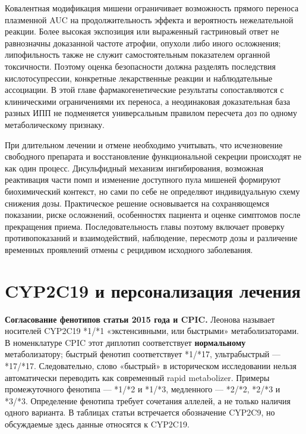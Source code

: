 \documentclass[11pt,a4paper,notitlepage]{report}
\newcommand{\src}[1]{\unskip\space\cite{#1}}
\begin{document}
Ковалентная модификация мишени ограничивает возможность прямого переноса плазменной AUC на продолжительность эффекта и вероятность нежелательной реакции. Более высокая экспозиция или выраженный гастриновый ответ не равнозначны доказанной частоте атрофии, опухоли либо иного осложнения; липофильность также не служит самостоятельным показателем органной токсичности. Поэтому оценка безопасности должна разделять последствия кислотосупрессии, конкретные лекарственные реакции и наблюдательные ассоциации. В этой главе фармакогенетические результаты сопоставляются с клиническими ограничениями их переноса, а неодинаковая доказательная база разных ИПП не подменяется универсальным правилом пересчета доз по одному метаболическому признаку.\src{molcys,molrestore,leonova2015,cpic,uslabel,kidney}

При длительном лечении и отмене необходимо учитывать, что исчезновение свободного препарата и восстановление функциональной секреции происходят не как один процесс. Дисульфидный механизм ингибирования, возможная реактивация части помп и изменение доступного пула мишеней формируют биохимический контекст, но сами по себе не определяют индивидуальную схему снижения дозы. Практическое решение основывается на сохраняющемся показании, риске осложнений, особенностях пациента и оценке симптомов после прекращения приема. Последовательность главы поэтому включает проверку противопоказаний и взаимодействий, наблюдение, пересмотр дозы и различение временных проявлений отмены с рецидивом исходного заболевания.\src{molrestore,withdrawbell,withdrawniklasson,agadepres,uslabel}

\section{CYP2C19 и персонализация лечения}
\label{sec:pharmacogenetics}

\textbf{Согласование фенотипов статьи 2015 года и CPIC.} Леонова называет носителей CYP2C19 *1/*1 «экстенсивными, или быстрыми» метаболизаторами. В номенклатуре CPIC этот диплотип соответствует \textbf{нормальному} метаболизатору; быстрый фенотип соответствует *1/*17, ультрабыстрый --- *17/*17. Следовательно, слово «быстрый» в историческом исследовании нельзя автоматически переводить как современный rapid metabolizer. Примеры промежуточного фенотипа --- *1/*2 и *1/*3, медленного --- *2/*2, *2/*3 и *3/*3. Определение фенотипа требует сочетания аллелей, а не только наличия одного варианта. В таблицах статьи встречается обозначение CYP2C9, но обсуждаемые здесь данные относятся к CYP2C19.\src{leonova2015,cpic}
\end{document}
